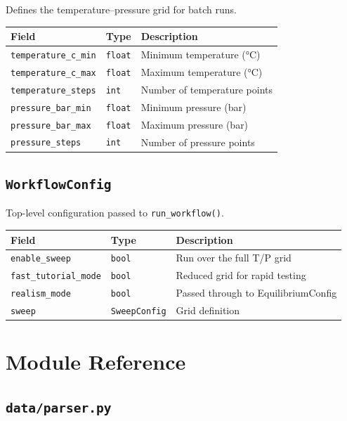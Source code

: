 \documentclass[12pt, a4paper]{article}
\begin{document}
Defines the temperature--pressure grid for batch runs.

\begin{longtable}{lll}
\toprule
\textbf{Field} & \textbf{Type} & \textbf{Description} \\
\midrule
\texttt{temperature\_c\_min} & \texttt{float} & Minimum temperature (°C) \\
\texttt{temperature\_c\_max} & \texttt{float} & Maximum temperature (°C) \\
\texttt{temperature\_steps} & \texttt{int} & Number of temperature points \\
\texttt{pressure\_bar\_min} & \texttt{float} & Minimum pressure (bar) \\
\texttt{pressure\_bar\_max} & \texttt{float} & Maximum pressure (bar) \\
\texttt{pressure\_steps} & \texttt{int} & Number of pressure points \\
\bottomrule
\end{longtable}

\subsection{\texttt{WorkflowConfig}}

Top-level configuration passed to \texttt{run\_workflow()}.

\begin{longtable}{lll}
\toprule
\textbf{Field} & \textbf{Type} & \textbf{Description} \\
\midrule
\texttt{enable\_sweep} & \texttt{bool} & Run over the full T/P grid \\
\texttt{fast\_tutorial\_mode} & \texttt{bool} & Reduced grid for rapid testing \\
\texttt{realism\_mode} & \texttt{bool} & Passed through to EquilibriumConfig \\
\texttt{sweep} & \texttt{SweepConfig} & Grid definition \\
\bottomrule
\end{longtable}

\section{Module Reference}

\subsection{\texttt{data/parser.py}}
\end{document}
